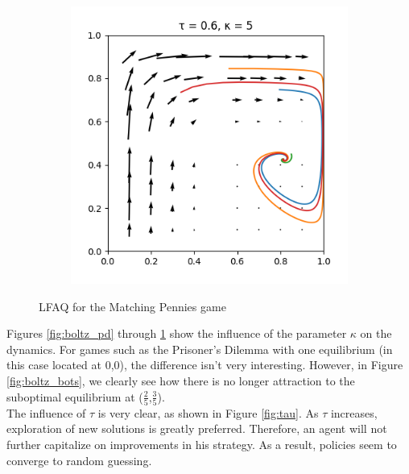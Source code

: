 \documentclass[10pt,a4paper]{article}
\begin{document}
\begin{figure}[h]
\begin{subfigure}[b]{0.30\textwidth}
    \end{subfigure}
    \begin{subfigure}[b]{0.30\textwidth}
        \includegraphics[width=\textwidth]{Figures/boltzmann_mp_5.png}
    \end{subfigure}
    \caption{LFAQ for the Matching Pennies game}
    \label{fig:boltz_mp}
\end{figure}

Figures \ref{fig:boltz_pd} through \ref{fig:boltz_mp} show the influence of the parameter $\kappa$ on the dynamics. For games such as the Prisoner's Dilemma with one equilibrium (in this case located at 0,0), the difference isn't very interesting. However, in Figure \ref{fig:boltz_bots}, we clearly see how there is no longer attraction to the suboptimal equilibrium at ($\frac{2}{5}$,$\frac{3}{5}$).
\\
The influence of $\tau$ is very clear, as shown in Figure \ref{fig:tau}. As $\tau$ increases, exploration of new solutions is greatly preferred. Therefore, an agent will not further capitalize on improvements in his strategy. As a result, policies seem to converge to random guessing. 
\end{document}

